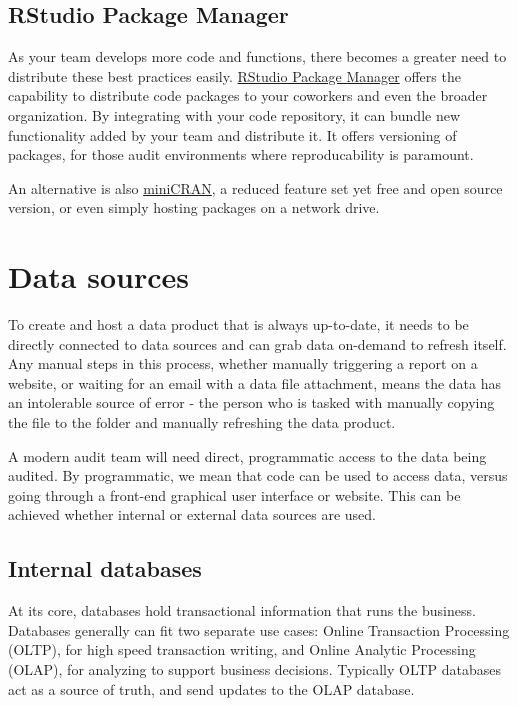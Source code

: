 \documentclass[
]{book}
\begin{document}
\hypertarget{rstudio-package-manager}{%
\subsection{RStudio Package Manager}\label{rstudio-package-manager}}

As your team develops more code and functions, there becomes a greater need to distribute these best practices easily. \href{https://rstudio.com/products/package-manager/}{RStudio Package Manager} offers the capability to distribute code packages to your coworkers and even the broader organization. By integrating with your code repository, it can bundle new functionality added by your team and distribute it. It offers versioning of packages, for those audit environments where reproducability is paramount.

An alternative is also \href{https://cran.r-project.org/web/packages/miniCRAN/index.html}{miniCRAN}, a reduced feature set yet free and open source version, or even simply hosting packages on a network drive.

\hypertarget{data-sources}{%
\section{Data sources}\label{data-sources}}

To create and host a data product that is always up-to-date, it needs to be directly connected to data sources and can grab data on-demand to refresh itself. Any manual steps in this process, whether manually triggering a report on a website, or waiting for an email with a data file attachment, means the data has an intolerable source of error - the person who is tasked with manually copying the file to the folder and manually refreshing the data product.

A modern audit team will need direct, programmatic access to the data being audited. By programmatic, we mean that code can be used to access data, versus going through a front-end graphical user interface or website. This can be achieved whether internal or external data sources are used.

\hypertarget{internal-databases}{%
\subsection{Internal databases}\label{internal-databases}}

At its core, databases hold transactional information that runs the business. Databases generally can fit two separate use cases: Online Transaction Processing (OLTP), for high speed transaction writing, and Online Analytic Processing (OLAP), for analyzing to support business decisions. Typically OLTP databases act as a source of truth, and send updates to the OLAP database.
\end{document}
